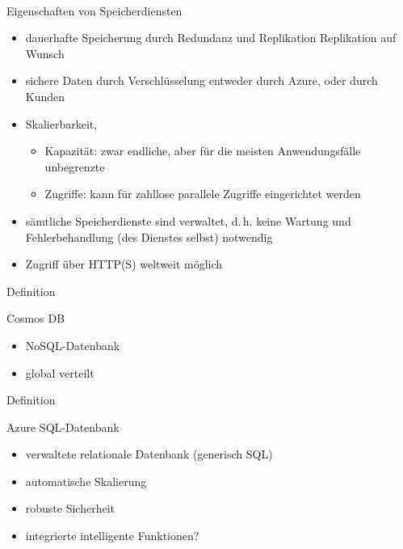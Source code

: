 \documentclass{scrartcl}
\newenvironment{flashcard}[2][]{%
    #1
    \vfill
    \centerline{\Large{#2}}
    \vfill
\newpage
}
{\newpage}
\begin{document}
    \begin{flashcard}[\ ]{Eigenschaften von Speicherdiensten}
        \begin{itemize}
            \item dauerhafte Speicherung durch Redundanz und Replikation\newline
            Replikation auf Wunsch
            \item sichere Daten durch Verschlüsselung\newline
            entweder durch Azure, oder durch Kunden
            \item Skalierbarkeit,
            \begin{itemize}
                \item Kapazität: zwar endliche, aber für die meisten Anwendungsfälle unbegrenzte
                \item Zugriffe: kann für zahllose parallele Zugriffe eingerichtet werden
            \end{itemize}
            \item sämtliche Speicherdienste sind verwaltet, d.\,h. keine Wartung und Fehlerbehandlung (des Dienstes selbst) notwendig
            \item Zugriff über HTTP(S) weltweit möglich
        \end{itemize}
    \end{flashcard}

    \begin{flashcard}[Definition]{Cosmos DB}
        \begin{itemize}
            \item NoSQL-Datenbank
            \item global verteilt
        \end{itemize}
    \end{flashcard}

    \begin{flashcard}[Definition]{Azure SQL-Datenbank}
        \begin{itemize}
            \item verwaltete relationale Datenbank (generisch SQL)
            \item automatische Skalierung
            \item robuste Sicherheit
            \item integrierte intelligente Funktionen?
        \end{itemize}
    \end{flashcard}
\end{document}
